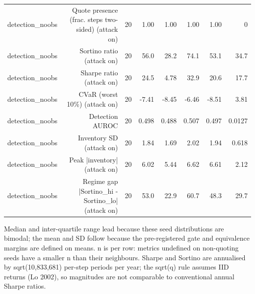 \begin{table}[htbp]
\begin{tabular}{lrrrrrrr}
    detection\_noobs & Quote presence (frac. steps two-sided) (attack on) & 20 & 1.00 & 1.00 & 1.00 & 1.00 & 0 \\
    detection\_noobs & Sortino ratio (attack on) & 20 & 56.0 & 28.2 & 74.1 & 53.1 & 34.7 \\
    detection\_noobs & Sharpe ratio (attack on) & 20 & 24.5 & 4.78 & 32.9 & 20.6 & 17.7 \\
    detection\_noobs & CVaR (worst 10\%) (attack on) & 20 & -7.41 & -8.45 & -6.46 & -8.51 & 3.81 \\
    detection\_noobs & Detection AUROC & 20 & 0.498 & 0.488 & 0.507 & 0.497 & 0.0127 \\
    detection\_noobs & Inventory SD (attack on) & 20 & 1.84 & 1.69 & 2.02 & 1.94 & 0.618 \\
    detection\_noobs & Peak |inventory| (attack on) & 20 & 6.02 & 5.44 & 6.62 & 6.61 & 2.12 \\
    detection\_noobs & Regime gap  |Sortino\_hi - Sortino\_lo| (attack on) & 20 & 53.0 & 22.9 & 60.7 & 48.3 & 29.7 \\
    \bottomrule
  \end{tabular}
  \begin{minipage}{\linewidth}\vspace{4pt}\footnotesize Median and inter-quartile range lead because these seed distributions are bimodal; the mean and SD follow because the pre-registered gate and equivalence margins are defined on means. n is per row: metrics undefined on non-quoting seeds have a smaller n than their neighbours. Sharpe and Sortino are annualised by sqrt(10,833,681) per-step periods per year; the sqrt(q) rule assumes IID returns (Lo 2002), so magnitudes are not comparable to conventional annual Sharpe ratios.\end{minipage}
\end{table}
